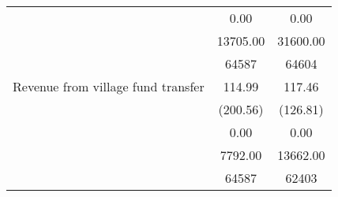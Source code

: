 \begin{tabular}{l*{2}{c}}
                &     0.00&     0.00\\
                & 13705.00& 31600.00\\
                &    64587&    64604\\
Revenue from village fund transfer&   114.99&   117.46\\
                & (200.56)& (126.81)\\
                &     0.00&     0.00\\
                &  7792.00& 13662.00\\
                &    64587&    62403\\
\bottomrule
\end{tabular}
